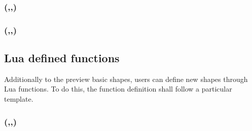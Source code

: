 \subsubsection[flip]{(,,)}

\subsubsection[loop]{(,,)}

\subsection{Lua defined functions}


Additionally to the preview basic shapes, users can define new shapes through Lua functions. To do this, the function definition shall follow a particular template.
	\fwarn


\subsubsection[add\_lua\_def]{(,,)}


